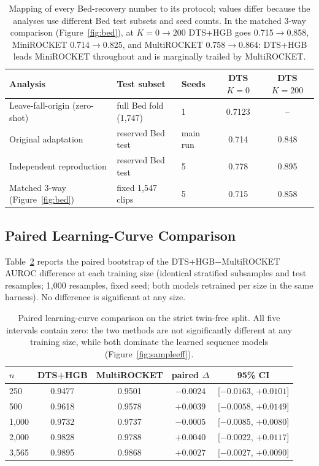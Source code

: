 \begin{table}[h]
\centering
\small
\begin{tabular}{lllcc}
\toprule
Analysis & Test subset & Seeds & DTS $K{=}0$ & DTS $K{=}200$ \\
\midrule
Leave-fall-origin (zero-shot) & full Bed fold (1,747) & 1 & 0.7123 & -- \\
Original adaptation & reserved Bed test & main run & 0.714 & 0.848 \\
Independent reproduction & reserved Bed test & 5 & 0.778 & 0.895 \\
Matched 3-way (Figure~\ref{fig:bed}) & fixed 1,547 clips & 5 & 0.715 & 0.858 \\
\bottomrule
\end{tabular}
\caption{Mapping of every Bed-recovery number to its protocol; values differ because the analyses use different Bed test subsets and seed counts. In the matched 3-way comparison (Figure~\ref{fig:bed}), at $K{=}0\rightarrow200$ DTS+HGB goes 0.715$\rightarrow$0.858, MiniROCKET 0.714$\rightarrow$0.825, and MultiROCKET 0.758$\rightarrow$0.864: DTS+HGB leads MiniROCKET throughout and is marginally trailed by MultiROCKET.}
\label{tab:bedmap}
\end{table}

\subsection{Paired Learning-Curve Comparison}
Table~\ref{tab:lcpaired} reports the paired bootstrap of the DTS+HGB$-$MultiROCKET AUROC difference at each training size (identical stratified subsamples and test resamples; 1,000 resamples, fixed seed; both models retrained per size in the same harness). No difference is significant at any size.

\begin{table}[h]
\centering
\small
\begin{tabular}{lcccc}
\toprule
$n$ & DTS+HGB & MultiROCKET & paired $\Delta$ & 95\% CI \\
\midrule
250 & 0.9477 & 0.9501 & $-0.0024$ & [$-0.0163$, $+0.0101$] \\
500 & 0.9618 & 0.9578 & $+0.0039$ & [$-0.0058$, $+0.0149$] \\
1{,}000 & 0.9732 & 0.9737 & $-0.0005$ & [$-0.0085$, $+0.0080$] \\
2{,}000 & 0.9828 & 0.9788 & $+0.0040$ & [$-0.0022$, $+0.0117$] \\
3{,}565 & 0.9895 & 0.9868 & $+0.0027$ & [$-0.0027$, $+0.0090$] \\
\bottomrule
\end{tabular}
\caption{Paired learning-curve comparison on the strict twin-free split. All five intervals contain zero: the two methods are not significantly different at any training size, while both dominate the learned sequence models (Figure~\ref{fig:sampleeff}).}
\label{tab:lcpaired}
\end{table}


